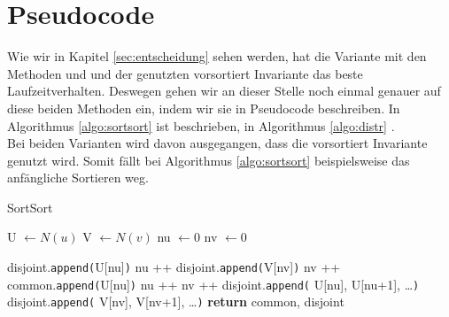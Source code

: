 

\section{Pseudocode}
Wie wir in Kapitel \ref{sec:entscheidung} sehen werden, 
hat die Variante mit den Methoden \SorSor{} und \distr{} und der genutzten vorsortiert
Invariante das beste Laufzeitverhalten. Deswegen gehen wir an dieser Stelle 
noch einmal genauer auf diese beiden Methoden ein, indem wir sie in Pseudocode
beschreiben. In Algorithmus \ref{algo:sortsort} ist \SorSor{} beschrieben, in Algorithmus \ref{algo:distr}
\distr.
\\

Bei beiden Varianten wird davon ausgegangen, dass die vorsortiert Invariante genutzt wird.
Somit fällt bei Algorithmus \ref{algo:sortsort} beispielsweise das anfängliche Sortieren weg.

\begin{algorithm}
  \caption{SortSort}\label{algo:sortsort}
  \begin{algorithmic}[1]
	  \State U $ \gets N(u)$ 
	  \State V $ \gets N(v)$ 
	  \State nu $\gets 0$ 
	  \State nv $\gets 0$ 
      
			\State disjoint.\texttt{append(}U[nu]\texttt{)} 
			\State nu ++
				\State disjoint.\texttt{append(}V[nv]\texttt{)} 
				\State nv ++
				\State common.\texttt{append(}U[nu]\texttt{)} 
				\State nu ++
				\State nv ++
        \EndIf
      \EndWhile
       
			\State disjoint.\texttt{append(} U[nu], U[nu+1], \dots\texttt{)}
			\Else{}
			\State disjoint.\texttt{append(} V[nv], V[nv+1], \dots\texttt{)}
      \EndIf
      \State \textbf{return} common, disjoint
   \EndProcedure
  \end{algorithmic}
  \label{algo:sortsort}
\end{algorithm}



